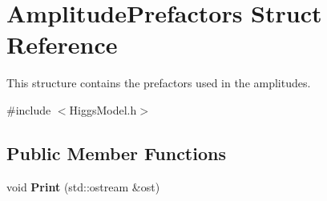 \hypertarget{structAmplitudePrefactors}{}\section{Amplitude\+Prefactors Struct Reference}
\label{structAmplitudePrefactors}


This structure contains the prefactors used in the amplitudes.  




{\ttfamily \#include $<$Higgs\+Model.\+h$>$}

\subsection*{Public Member Functions}
\begin{DoxyCompactItemize}
\item 
\hypertarget{structAmplitudePrefactors_af5859a1f9403b3900e1a1a798ad071ea}{}void {\bfseries Print} (std\+::ostream \&ost)\label{structAmplitudePrefactors_af5859a1f9403b3900e1a1a798ad071ea}

\end{DoxyCompactItemize}
